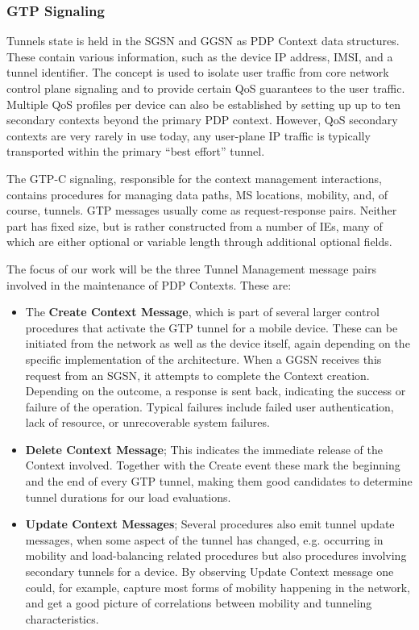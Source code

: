 \subsubsection{GTP Signaling}

Tunnels state is held in the \ac{SGSN} and \ac{GGSN} as \ac{PDP} Context data structures. These contain various information, such as the device IP address, \ac{IMSI}, and a tunnel identifier. The concept is used to isolate user traffic from core network control plane signaling and to provide certain \ac{QoS} guarantees to the user traffic. Multiple \ac{QoS} profiles per device can also be established by setting up up to ten secondary contexts beyond the primary PDP context. However, \ac{QoS} secondary contexts are very rarely in use today, any user-plane IP traffic is typically transported within the primary ``best effort'' tunnel.

The GTP-C signaling, responsible for the context management interactions, contains procedures for managing data paths, \ac{MS} locations, mobility, and, of course, tunnels. \ac{GTP} messages usually come as request-response pairs. Neither part has fixed size, but is rather constructed from a number of \acp{IE}, many of which are either optional or variable length through additional optional fields.

The focus of our work will be the three Tunnel Management message pairs involved in the maintenance of PDP Contexts. These are:

\begin{itemize}
\item The \textbf{Create Context Message}, which is part of several larger control procedures that activate the GTP tunnel for a mobile device. These can be initiated from the network as well as the device itself, again depending on the specific implementation of the architecture. When a \ac{GGSN} receives this request from an \ac{SGSN}, it attempts to complete the Context creation. Depending on the outcome, a response is sent back, indicating the success or failure of the operation. Typical failures include failed user authentication, lack of resource, or unrecoverable system failures.

\item \textbf{Delete Context Message}; This indicates the immediate release of the Context involved. 
Together with the Create event these mark the beginning and the end of every GTP tunnel, making them good candidates to determine tunnel durations for our load evaluations.

\item \textbf{Update Context Messages}; Several procedures also emit tunnel update messages, when some aspect of the tunnel has changed, e.g. occurring in mobility and load-balancing related procedures but also procedures involving secondary tunnels for a device.
By observing Update Context message one could, for example, capture most forms of mobility happening in the network, and get a good picture of correlations between mobility and tunneling characteristics. 
\end{itemize}

